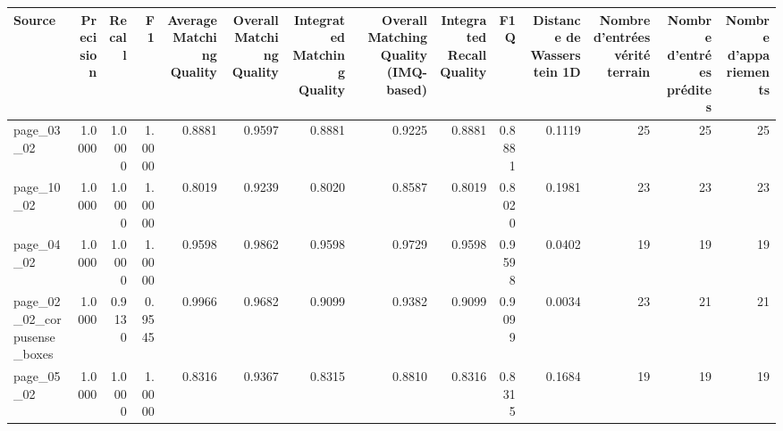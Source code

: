\begin{tabular}{lrrrrrrrrrrrrr}
\toprule
Source & Precision & Recall & F1 & Average Matching Quality & Overall Matching Quality & Integrated Matching Quality & Overall Matching Quality (IMQ-based) & Integrated Recall Quality & F1Q & Distance de Wasserstein 1D & Nombre d'entrées vérité terrain & Nombre d'entrées prédites & Nombre d'appariements \\
\midrule
page\_03\_02 & 1.0000 & 1.0000 & 1.0000 & 0.8881 & 0.9597 & 0.8881 & 0.9225 & 0.8881 & 0.8881 & 0.1119 & 25 & 25 & 25 \\
page\_10\_02 & 1.0000 & 1.0000 & 1.0000 & 0.8019 & 0.9239 & 0.8020 & 0.8587 & 0.8019 & 0.8020 & 0.1981 & 23 & 23 & 23 \\
page\_04\_02 & 1.0000 & 1.0000 & 1.0000 & 0.9598 & 0.9862 & 0.9598 & 0.9729 & 0.9598 & 0.9598 & 0.0402 & 19 & 19 & 19 \\
page\_02\_02\_corpusense\_boxes & 1.0000 & 0.9130 & 0.9545 & 0.9966 & 0.9682 & 0.9099 & 0.9382 & 0.9099 & 0.9099 & 0.0034 & 23 & 21 & 21 \\
page\_05\_02 & 1.0000 & 1.0000 & 1.0000 & 0.8316 & 0.9367 & 0.8315 & 0.8810 & 0.8316 & 0.8315 & 0.1684 & 19 & 19 & 19 \\
\bottomrule
\end{tabular}
